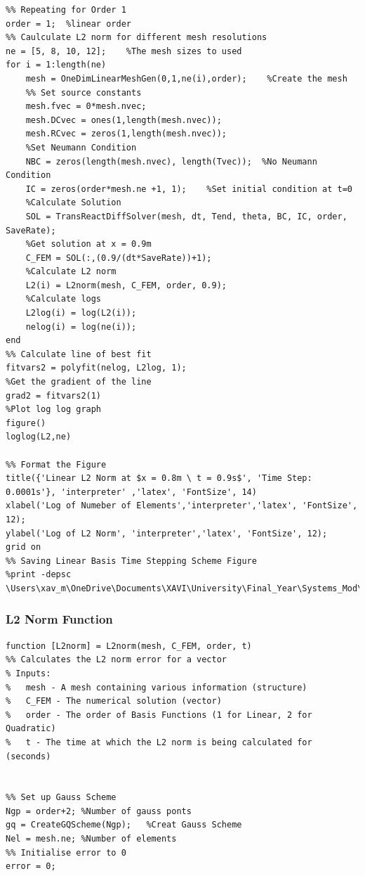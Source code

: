 \documentclass[11pt]{article}
\begin{document}
\begin{appendices}
\begin{lstlisting}
%% Repeating for Order 1
order = 1;  %linear order
%% Caulculate L2 norm for different mesh resolutions
ne = [5, 8, 10, 12];    %The mesh sizes to used
for i = 1:length(ne)
    mesh = OneDimLinearMeshGen(0,1,ne(i),order);    %Create the mesh
    %% Set source constants
    mesh.fvec = 0*mesh.nvec;
    mesh.DCvec = ones(1,length(mesh.nvec));
    mesh.RCvec = zeros(1,length(mesh.nvec));
    %Set Neumann Condition
    NBC = zeros(length(mesh.nvec), length(Tvec));  %No Neumann Condition
    IC = zeros(order*mesh.ne +1, 1);    %Set initial condition at t=0
    %Calculate Solution
    SOL = TransReactDiffSolver(mesh, dt, Tend, theta, BC, IC, order, SaveRate);
    %Get solution at x = 0.9m
    C_FEM = SOL(:,(0.9/(dt*SaveRate))+1);
    %Calculate L2 norm
    L2(i) = L2norm(mesh, C_FEM, order, 0.9);
    %Calculate logs
    L2log(i) = log(L2(i));
    nelog(i) = log(ne(i));
end
%% Calculate line of best fit
fitvars2 = polyfit(nelog, L2log, 1);
%Get the gradient of the line
grad2 = fitvars2(1)
%Plot log log graph
figure()
loglog(L2,ne)

%% Format the Figure
title({'Linear L2 Norm at $x = 0.8m \ t = 0.9s$', 'Time Step: 0.0001s'}, 'interpreter' ,'latex', 'FontSize', 14)
xlabel('Log of Numeber of Elements','interpreter','latex', 'FontSize', 12);
ylabel('Log of L2 Norm', 'interpreter','latex', 'FontSize', 12);
grid on
%% Saving Linear Basis Time Stepping Scheme Figure
%print -depsc \Users\xav_m\OneDrive\Documents\XAVI\University\Final_Year\Systems_Mod\Modeling_CW2\Report\Figures\epsQ1L2O1

\end{lstlisting}
\pagebreak

\subsubsection{L2 Norm Function}\label{ap:L2Function}

\begin{lstlisting}
function [L2norm] = L2norm(mesh, C_FEM, order, t)
%% Calculates the L2 norm error for a vector
% Inputs:
%   mesh - A mesh containing various information (structure)
%   C_FEM - The numerical solution (vector)
%   order - The order of Basis Functions (1 for Linear, 2 for Quadratic)
%   t - The time at which the L2 norm is being calculated for (seconds)


%% Set up Gauss Scheme
Ngp = order+2; %Number of gauss ponts
gq = CreateGQScheme(Ngp);   %Creat Gauss Scheme
Nel = mesh.ne; %Number of elements
%% Initialise error to 0
error = 0;


\end{lstlisting}
\end{appendices}
\end{document}
